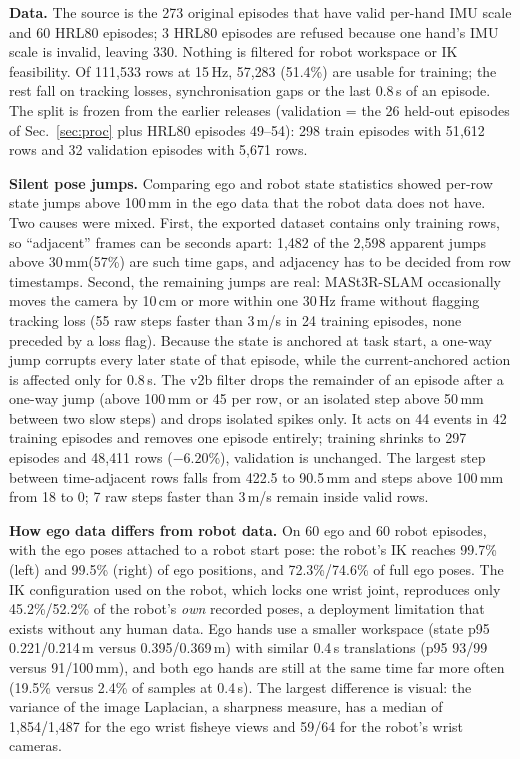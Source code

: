 \documentclass[conference,10pt]{IEEEtran}
\newcommand{\mm}{\,mm\xspace}
\begin{document}
\textbf{Data.} The source is the 273 original episodes that have valid per-hand IMU scale and 60 HRL80 episodes; 3 HRL80 episodes
are refused because one hand's IMU scale is invalid, leaving 330. Nothing is filtered for robot workspace or IK feasibility.
Of 111{,}533 rows at 15\,Hz, 57{,}283 (51.4\%) are usable for training; the rest fall on tracking losses, synchronisation gaps
or the last 0.8\,s of an episode. The split is frozen from the earlier releases (validation = the 26 held-out episodes of
Sec.~\ref{sec:proc} plus HRL80 episodes 49--54): 298 train episodes with 51{,}612 rows and 32 validation episodes with 5{,}671 rows.

\textbf{Silent pose jumps.} Comparing ego and robot state statistics showed per-row state jumps above 100\mm in the ego data
that the robot data does not have. Two causes were mixed. First, the exported dataset contains only training rows, so
``adjacent'' frames can be seconds apart: 1{,}482 of the 2{,}598 apparent jumps above 30\mm (57\%) are such time gaps, and
adjacency has to be decided from row timestamps. Second, the remaining jumps are real: MASt3R-SLAM occasionally moves the
camera by 10\,cm or more within one 30\,Hz frame without flagging tracking loss (55 raw steps faster than 3\,m/s in 24 training
episodes, none preceded by a loss flag). Because the state is anchored at task start, a one-way jump corrupts every later
state of that episode, while the current-anchored action is affected only for 0.8\,s. The v2b filter drops the remainder of an
episode after a one-way jump (above 100\mm or 45\textdegree{} per row, or an isolated step above 50\mm between two slow steps)
and drops isolated spikes only. It acts on 44 events in 42 training episodes and removes one episode entirely; training
shrinks to 297 episodes and 48{,}411 rows ($-6.20$\%), validation is unchanged. The largest step between time-adjacent rows
falls from 422.5 to 90.5\mm and steps above 100\mm from 18 to 0; 7 raw steps faster than 3\,m/s remain inside valid rows.

\textbf{How ego data differs from robot data.} On 60 ego and 60 robot episodes, with the ego poses attached to a robot start
pose: the robot's IK reaches 99.7\% (left) and 99.5\% (right) of ego positions, and 72.3\%/74.6\% of full ego poses. The IK
configuration used on the robot, which locks one wrist joint, reproduces only 45.2\%/52.2\% of the robot's \emph{own} recorded
poses, a deployment limitation that exists without any human data. Ego hands use a smaller workspace (state p95 0.221/0.214\,m
versus 0.395/0.369\,m) with similar 0.4\,s translations (p95 93/99 versus 91/100\mm), and both ego hands are still at the same
time far more often (19.5\% versus 2.4\% of samples at 0.4\,s). The largest difference is visual: the variance of the image
Laplacian, a sharpness measure, has a median of 1{,}854/1{,}487 for the ego wrist fisheye views and 59/64 for the robot's wrist
cameras.
\end{document}
